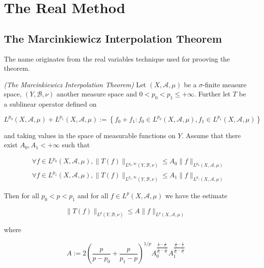 \section{The Real Method}
\subsection{The Marcinkiewicz Interpolation Theorem}
The name originates from the real variables technique used for prooving the theorem.
\vspace{2mm}
\begin{mdframed}
	\begin{theorem}\emph{(The Marcinkiewicz Interpolation Theorem)}
		Let $(X,\mathcal{A},\mu)$ be a $\sigma$-finite measure space, $(Y,\mathcal{B},\nu)$ another measure space and $0 < p_0 < p_1 \leqslant + \infty$. Further let $T$ be a sublinear operator defined on
		
		\begin{equation*}
			L^{p_0}(X,\mathcal{A},\mu) + L^{p_1}(X,\mathcal{A},\mu) := \left\{ f_0 + f_1 : f_0 \in L^{p_0}(X,\mathcal{A},\mu), f_1 \in L^{p_1}(X,\mathcal{A},\mu) \right\}
		\end{equation*}
		
		and taking values in the space of measurable functions on $Y$. Assume that there exist $A_0,A_1 < + \infty$ such that

		\begin{align}
			&\forall f \in L^{p_0}(X,\mathcal{A},\mu), \|T(f)\|_{L^{p_0,\infty}(Y,\mathcal{B},\nu)} \leqslant A_0 \|f\|_{L^{p_0}(X,\mathcal{A},\mu)}\\
			&\forall f \in L^{p_1}(X,\mathcal{A},\mu), \|T(f)\|_{L^{p_1,\infty}(Y,\mathcal{B},\nu)} \leqslant A_1 \|f\|_{L^{p_1}(X,\mathcal{A},\mu)}
		\end{align}

		Then for all $p_0 < p < p_1$ and for all $f \in L^p(X,\mathcal{A},\mu)$ we have the estimate

		\begin{equation}
			\|T(f)\|_{L^p(Y,\mathcal{B},\nu)} \leqslant A \|f\|_{L^p(X,\mathcal{A},\mu)}
		\end{equation}

		where

		\begin{equation}
			A := 2\left( \frac{p}{p - p_0} + \frac{p}{p_1 - p} \right)^{1/p}A_0^{\frac{\frac{1}{p} - \frac{1}{p_1}}{\frac{1}{p_0}-\frac{1}{p_1}}}A_1^{\frac{\frac{1}{p_0}-\frac{1}{p}}{\frac{1}{p_0}-\frac{1}{p_1}}}
			\label{eq:constant}
		\end{equation}
	\end{theorem}
\end{mdframed}

